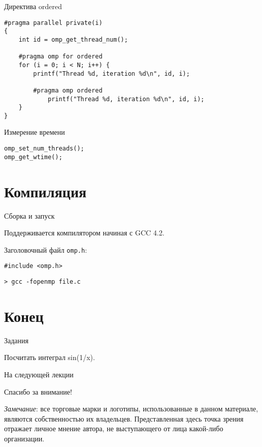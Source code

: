 \begin{frame}[fragile]{Директива ordered}

\begin{lstlisting}
#pragma parallel private(i)
{
    int id = omp_get_thread_num();

    #pragma omp for ordered
    for (i = 0; i < N; i++) {
        printf("Thread %d, iteration %d\n", id, i);

        #pragma omp ordered
            printf("Thread %d, iteration %d\n", id, i);
    }
}
\end{lstlisting}

\end{frame}

\begin{frame}[fragile]{Измерение времени}

\begin{lstlisting}
omp_set_num_threads();
omp_get_wtime();
\end{lstlisting}

\end{frame}

\section{Компиляция}

\begin{frame}[fragile]{Сборка и запуск}

Поддерживается компилятором начиная с GCC 4.2.

Заголовочный файл \texttt{omp.h}:

\begin{lstlisting}
#include <omp.h>
\end{lstlisting}

\begin{lstlisting}
> gcc -fopenmp file.c
\end{lstlisting}

\end{frame}

\section*{Конец}

\begin{frame}{Задания}

Посчитать интеграл sin(1/x).

\end{frame}

\begin{frame}{На следующей лекции}
\end{frame}

\begin{frame}

{\huge{Спасибо за внимание!}\par}

\vfill

\tiny{\textit{Замечание}: все торговые марки и логотипы, использованные в данном материале, являются собственностью их владельцев. Представленная здесь точка зрения отражает личное мнение автора, не выступающего от лица какой-либо организации.}

\end{frame}


